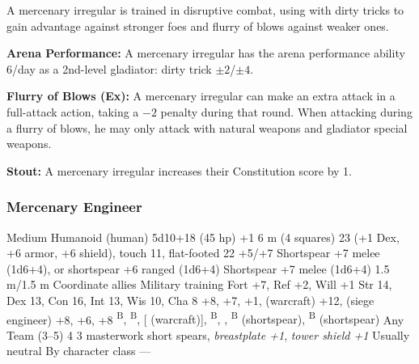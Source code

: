 
A mercenary irregular is trained in disruptive combat, using with dirty tricks to gain advantage against stronger foes and flurry of blows against weaker ones.

\textbf{Arena Performance:} A mercenary irregular has the arena performance ability 6/day as a 2nd-level gladiator: dirty trick $\pm2$/$\pm4$.

\textbf{Flurry of Blows (Ex):} A mercenary irregular can make an extra attack in a full-attack action, taking a $-2$ penalty during that round. When attacking during a flurry of blows, he may only attack with natural weapons and gladiator special weapons.

\textbf{Stout:} A mercenary irregular increases their Constitution score by 1.

\subsubsection{Mercenary Engineer}
\begin{MonsterStats}
{Medium Humanoid (human)}
{5d10+18 (45 hp)}
{+1}
{6 m (4 squares)}
{23 (+1 Dex, +6 armor, +6 shield), touch 11, flat-footed 22}
{+5/+7}
{Shortspear +7 melee (1d6+4), or shortspear +6 ranged (1d6+4)}
{Shortspear +7 melee (1d6+4)}
{1.5 m/1.5 m}
{Coordinate allies}
{Military training}
{Fort +7, Ref +2, Will +1}
{Str 14, Dex 13, Con 16, Int 13, Wis 10, Cha 8}
{
     +8,
     +7,
     +1,
     (warcraft) +12,
     (siege engineer) +8,
     +6,
     +8
}
{
    \textsuperscript{B},
    \textsuperscript{B},
     [ (warcraft)],
    \textsuperscript{B},
    ,
    \textsuperscript{B} (shortspear),
    \textsuperscript{B} (shortspear)
}
{Any}
{Team (3--5)}
{4}
{
    3 masterwork short spears,
    \emph{breastplate +1},
    \emph{tower shield +1}
}
{Usually neutral}
{By character class}
{---}
\end{MonsterStats}


